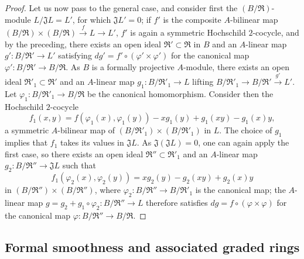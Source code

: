 \begin{proof}
Let us now pass to the general case, and consider first the $(B/\mathfrak{R})$-module $L/\mathfrak{J}L=L'$, for which $\mathfrak{J}L'=0$;
if $f'$ is the composite $A$-bilinear map $(B/\mathfrak{R})\times(B/\mathfrak{R})\xrightarrow{f}L\to L'$, $f'$ is again a symmetric Hochschild $2$-cocycle, and by the preceding, there exists an open ideal $\mathfrak{R}'\subset\mathfrak{R}$ in $B$ and an $A$-linear map $g':B/\mathfrak{R}'\to L'$ satisfying $dg'=f'\circ(\varphi'\times\varphi')$ for the canonical map $\varphi':B/\mathfrak{R}'\to B/\mathfrak{R}$.
As $B$ is a formally projective $A$-module, there exists an open ideal $\mathfrak{R}'_1\subset\mathfrak{R}'$ and an $A$-linear map $g_1:B/\mathfrak{R}'_1\to L$ lifting $B/\mathfrak{R}'_1\to B/\mathfrak{R}'\xrightarrow{g'}L'$.
Let $\varphi_1:B/\mathfrak{R}'_1\to B/\mathfrak{R}$ be the canonical homomorphism. Consider then the Hochschild $2$-cocycle
\[
  f_1(x,y) = f(\varphi_1(x),\varphi_1(y)) - xg_1(y) + g_1(xy) - g_1(x)y,
\]
a symmetric $A$-bilinear map of $(B/\mathfrak{R}'_1)\times(B/\mathfrak{R}'_1)$ in $L$.
The choice of $g_1$ implies that $f_1$ takes its values in $\mathfrak{J}L$.
As $\mathfrak{J}(\mathfrak{J}L)=0$, one can again apply the first case, so there exists an open ideal $\mathfrak{R}''\subset\mathfrak{R}'_1$ and an $A$-linear map $g_2:B/\mathfrak{R}''\to\mathfrak{J}L$ such that
\[
  f_1(\varphi_2(x),\varphi_2(y)) = xg_2(y) - g_2(xy) + g_2(x)y
\]
in $(B/\mathfrak{R}'')\times(B/\mathfrak{R}'')$, where $\varphi_2:B/\mathfrak{R}''\to B/\mathfrak{R}'_1$ is the canonical map;
the $A$-linear map $g=g_2+g_1\circ\varphi_2:B/\mathfrak{R}''\to L$ therefore satisfies $dg=f\circ(\varphi\times\varphi)$ for the canonical map $\varphi:B/\mathfrak{R}''\to B/\mathfrak{R}$.
\end{proof}

\subsection{Formal smoothness and associated graded rings}
\label{subsection:0.19.5}

